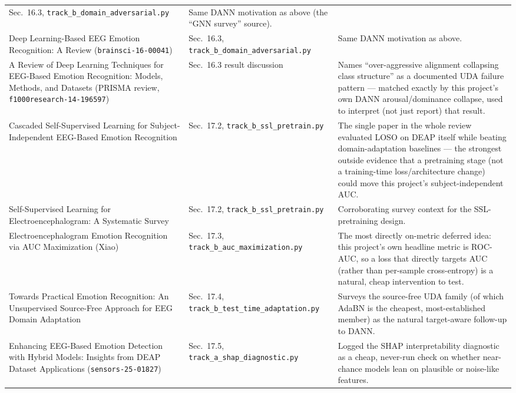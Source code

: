 \documentclass[11pt]{report}
\begin{document}
\begin{longtable}{p{4.7cm}p{4.3cm}p{5.5cm}}
Sec.\ 16.3, \texttt{track\_b\_domain\_adversarial.py} &
Same DANN motivation as above (the ``GNN survey'' source). \\
\addlinespace
Deep Learning-Based EEG Emotion Recognition: A Review (\texttt{brainsci-16-00041}) &
Sec.\ 16.3, \texttt{track\_b\_domain\_adversarial.py} &
Same DANN motivation as above. \\
\addlinespace
A Review of Deep Learning Techniques for EEG-Based Emotion Recognition:
Models, Methods, and Datasets (PRISMA review, \texttt{f1000research-14-196597}) &
Sec.\ 16.3 result discussion &
Names ``over-aggressive alignment collapsing class structure'' as a
documented UDA failure pattern --- matched exactly by this project's own
DANN arousal/dominance collapse, used to interpret (not just report) that
result. \\
\addlinespace
Cascaded Self-Supervised Learning for Subject-Independent EEG-Based
Emotion Recognition &
Sec.\ 17.2, \texttt{track\_b\_ssl\_pretrain.py} &
The single paper in the whole review evaluated LOSO on DEAP itself while
beating domain-adaptation baselines --- the strongest outside evidence that
a pretraining stage (not a training-time loss/architecture change) could
move this project's subject-independent AUC. \\
\addlinespace
Self-Supervised Learning for Electroencephalogram: A Systematic Survey &
Sec.\ 17.2, \texttt{track\_b\_ssl\_pretrain.py} &
Corroborating survey context for the SSL-pretraining design. \\
\addlinespace
Electroencephalogram Emotion Recognition via AUC Maximization (Xiao) &
Sec.\ 17.3, \texttt{track\_b\_auc\_maximization.py} &
The most directly on-metric deferred idea: this project's own headline
metric is ROC-AUC, so a loss that directly targets AUC (rather than
per-sample cross-entropy) is a natural, cheap intervention to test. \\
\addlinespace
Towards Practical Emotion Recognition: An Unsupervised Source-Free Approach
for EEG Domain Adaptation &
Sec.\ 17.4, \texttt{track\_b\_test\_time\_adaptation.py} &
Surveys the source-free UDA family (of which AdaBN is the cheapest,
most-established member) as the natural target-aware follow-up to DANN. \\
\addlinespace
Enhancing EEG-Based Emotion Detection with Hybrid Models: Insights from
DEAP Dataset Applications (\texttt{sensors-25-01827}) &
Sec.\ 17.5, \texttt{track\_a\_shap\_diagnostic.py} &
Logged the SHAP interpretability diagnostic as a cheap, never-run check on
whether near-chance models lean on plausible or noise-like features. \\
\bottomrule
\end{longtable}
\end{document}
